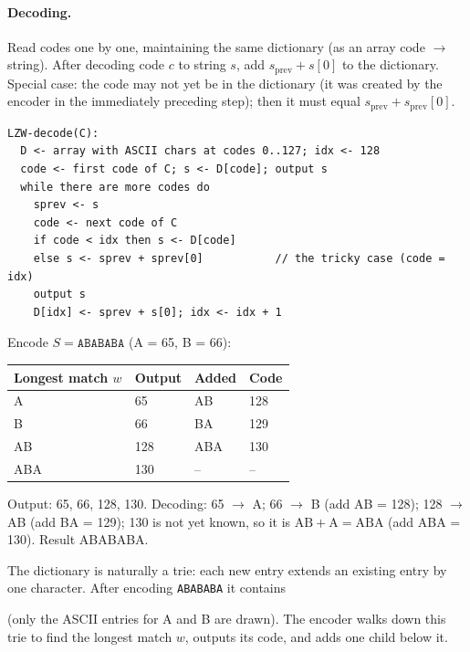 \paragraph{Decoding.} Read codes one by one, maintaining the same dictionary (as
an array code $\to$ string). After decoding code $c$ to string $s$, add
$s_{\text{prev}} + s[0]$ to the dictionary. Special case: the code may not yet be
in the dictionary (it was created by the encoder in the immediately preceding
step); then it must equal $s_{\text{prev}} + s_{\text{prev}}[0]$.

\begin{lstlisting}
LZW-decode(C):
  D <- array with ASCII chars at codes 0..127; idx <- 128
  code <- first code of C; s <- D[code]; output s
  while there are more codes do
    sprev <- s
    code <- next code of C
    if code < idx then s <- D[code]
    else s <- sprev + sprev[0]           // the tricky case (code = idx)
    output s
    D[idx] <- sprev + s[0]; idx <- idx + 1
\end{lstlisting}

\begin{example}
Encode $S = \texttt{ABABABA}$ (A = 65, B = 66):
\begin{center}
\begin{tabular}{llll}
\toprule
Longest match $w$ & Output & Added & Code\\
\midrule
A & 65 & AB & 128\\
B & 66 & BA & 129\\
AB & 128 & ABA & 130\\
ABA & 130 & -- & --\\
\bottomrule
\end{tabular}
\end{center}
Output: 65, 66, 128, 130. Decoding: 65 $\to$ A; 66 $\to$ B (add AB = 128);
128 $\to$ AB (add BA = 129); 130 is not yet known, so it is
$\text{AB} + \text{A} = \text{ABA}$ (add ABA = 130). Result ABABABA.
\end{example}

The dictionary is naturally a trie: each new entry extends an existing entry by
one character. After encoding \texttt{ABABABA} it contains
\begin{center}
\end{center}
(only the ASCII entries for A and B are drawn). The encoder walks down this trie to find the longest
match $w$, outputs its code, and adds one child below it.


